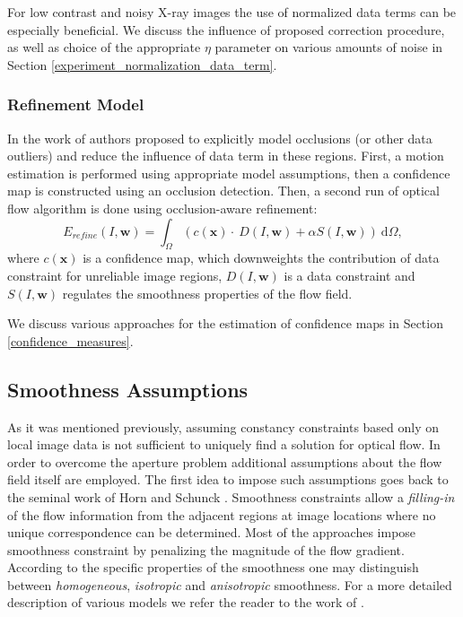 For low contrast and noisy X-ray images the use of normalized data terms can be especially beneficial. We discuss the influence of proposed correction procedure, as well as choice of the appropriate $\eta$ parameter on various amounts of noise in Section \ref{experiment_normalization_data_term}.

\subsubsection{Refinement Model}
\label{refinement}

In the work of \cite{Xu10} authors proposed to explicitly model occlusions (or other data outliers) and reduce the influence of data term in these regions.  First, a motion estimation is performed using appropriate model assumptions, then a confidence map is constructed using an occlusion detection. Then, a second run of optical flow algorithm is done using occlusion-aware refinement:
$$E_{refine}(I, \textbf{w}) = \int_{\Omega}{(c(\textbf{x}) \cdot \: D(I, \textbf{w}) + \alpha   S(I, \textbf{w})) \: \text{d}\Omega},$$
where $c(\textbf{x})$ is a confidence map, which downweights the contribution of data constraint for unreliable image regions, $D(I,\textbf{w})$ is a data constraint and $S(I, \textbf{w})$ regulates the smoothness properties of the flow field. 

We discuss various approaches for the estimation of confidence maps in Section \ref{confidence_measures}.


\subsection{Smoothness Assumptions}
\label{smoothness_assumptions}


As it was mentioned previously, assuming constancy constraints based only on local image data is not sufficient to uniquely find a solution for optical flow. In order to overcome the aperture problem additional assumptions about the  flow field itself are employed. The first idea to impose such assumptions goes back to the seminal work of Horn and Schunck \cite{HornSchunck81}. Smoothness constraints allow a \textit{filling-in} \cite{Weickert00b} of the flow information from the adjacent regions at image locations where no unique correspondence can be determined. Most of the approaches impose smoothness constraint by penalizing the magnitude of the flow gradient. 
According to the specific properties of the smoothness one may distinguish between \textit{homogeneous}, \textit{isotropic} and \textit{anisotropic} smoothness. For a more detailed description of various models we refer the reader to the work of \cite{Weickert00b}.

